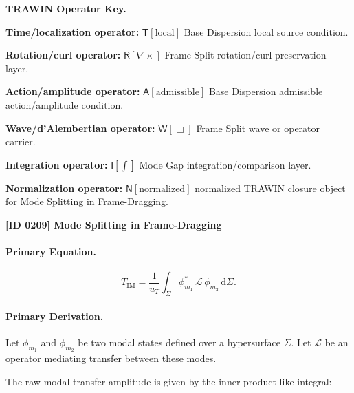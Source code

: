 \par\vspace{0.45\baselineskip}
\noindent\begin{minipage}[t]{\linewidth}
\begingroup
\small
\raggedright
\textbf{TRAWIN Operator Key.}\par
\noindent\textbf{Time/localization operator:} $\mathsf{T}\!\left[\mathrm{local}\right]$ Base Dispersion local source condition.\par
\noindent\textbf{Rotation/curl operator:} $\mathsf{R}\!\left[\nabla\times\right]$ Frame Split rotation/curl preservation layer.\par
\noindent\textbf{Action/amplitude operator:} $\mathsf{A}\!\left[\mathrm{admissible}\right]$ Base Dispersion admissible action/amplitude condition.\par
\noindent\textbf{Wave/d'Alembertian operator:} $\mathsf{W}\!\left[\Box\right]$ Frame Split wave or operator carrier.\par
\noindent\textbf{Integration operator:} $\mathsf{I}\!\left[\int\right]$ Mode Gap integration/comparison layer.\par
\noindent\textbf{Normalization operator:} $\mathsf{N}\!\left[\mathrm{normalized}\right]$ normalized TRAWIN closure object for Mode Splitting in Frame-Dragging.\par
\endgroup
\end{minipage}

\clearpage
\noindent\textbf{[ID 0209] Mode Splitting in Frame-Dragging}\par
\vspace{0.35em}
\paragraph{Primary Equation.}
\begin{equation}
T_{\mathrm{IM}}
=
\frac{1}{u_T}
\int_{\Sigma}
\phi_{m_1}^{*}
\,\mathcal{L}\,
\phi_{m_2}
\,\mathrm{d}\Sigma .
\end{equation}

\paragraph{Primary Derivation.}
Let $\phi_{m_1}$ and $\phi_{m_2}$ be two modal states defined over a hypersurface $\Sigma$.  
Let $\mathcal{L}$ be an operator mediating transfer between these modes.

The raw modal transfer amplitude is given by the inner-product-like integral:

